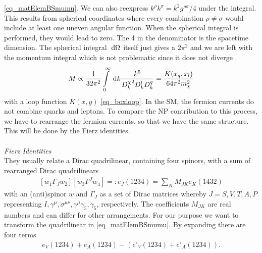 \eqref{eq_matElemBSmumu}. We can also reexpress $k^\rho k^\sigma = k^2 g^{\rho\sigma}/4$ under the integral. This results from spherical coordinates where
every combination $\rho\neq\sigma$ would include at least one uneven angular function. When the spherical integral is performed, they would lead to zero. The 
4 in the denominator is the spacetime dimension. The spherical integral $\; \mathrm{d} \Omega$ itself just gives a $2\pi^2$ and we are left with the momentum integral
which is not problematic since it does not diverge
\begin{align}
 M \propto \frac{1}{32\pi^2} \int\limits_0^\infty \; \mathrm{d} k \frac{k^5}{{D^\chi_k}^2D^l_k D^q_k} = \frac{K(x_q,x_l)}{64\pi^2 m_\chi^2}
\end{align}
with a loop function $K(x,y)$ \eqref{eq_boxloop}.
In the SM, the fermion currents do not combine quarks and leptons. To compare the NP contribution to this process, we have to rearrange the fermion currents,
so that we have the same structure. This will be done by the Fierz identities.
\\ \\ \noindent \textit{Fierz Identities}\\
They usually relate a Dirac quadrilinear, containing four spinors, with a sum of rearranged Dirac quadrilinears \cite{Fierz}
\begin{align}
  \left[\bar w_1\Gamma_J^{} w_2\right] \left[\bar w_3 \Gamma^J w_4 \right] =: e_J(1234) = \sum\limits_K M_{JK} e_K(1432)
\end{align}
with an (anti)spinor $w$ and $\Gamma_J$ as a set of Dirac matrices whereby $J=S,V,T,A,P$ representing $I,\gamma^\mu,\sigma^{\mu\nu},\gamma^\mu\gamma_5,\gamma_5$, 
respectively. The coefficients $M_{JK}$ are real numbers and can differ for other arrangements.
\noindent For our purpose we want to transform the quadrilinear in \eqref{eq_matElemBSmumu}. By expanding there are four terms
\begin{align}
 e_V(1234)+e_A(1234)-\left(e'_V(1234) + e'_A(1234)\right).
 \label{eq_fierz}
\end{align}
